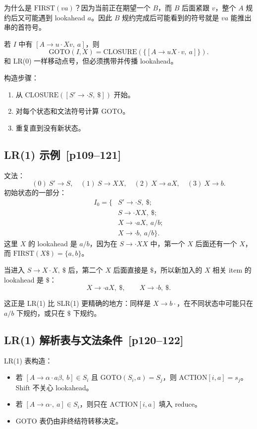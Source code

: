 \documentclass[UTF8,fontset=none,11pt]{ctexart}
\newenvironment{defbox}[1][]{%
  \par\medskip\noindent{\color{defrule}\rule{\linewidth}{1.1pt}}\par\nopagebreak
  \noindent{\bfseries\color{defrule}#1}\par\nopagebreak\smallskip}%
  {\par\nopagebreak\smallskip\noindent{\color{defrule}\rule{\linewidth}{0.4pt}}\par\medskip}
\newcommand{\pg}[1]{\texorpdfstring{{\small\color{graytext}\,[p#1]}}{ [p#1]}}
\newcommand{\FIRST}{\ensuremath{\mathrm{FIRST}}}
\newcommand{\ACTION}{\ensuremath{\mathrm{ACTION}}}
\newcommand{\GOTO}{\ensuremath{\mathrm{GOTO}}}
\newcommand{\CLOSURE}{\ensuremath{\mathrm{CLOSURE}}}
\begin{document}
为什么是 \(\FIRST(va)\)？因为当前正在期望一个 \(B\)，而 \(B\) 后面紧跟 \(v\)，整个 \(A\) 规约后又可能遇到 lookahead \(a\)。因此 \(B\) 规约完成后可能看到的符号就是 \(va\) 能推出串的首符号。

\begin{defbox}[LR(1) GOTO]
若 \(I\) 中有 \([A\to u\cdot Xv,\ a]\)，则
\[
\GOTO(I,X)=\CLOSURE(\{[A\to uX\cdot v,\ a]\}).
\]
和 LR(0) 一样移动点号，但必须携带并传播 lookahead。
\end{defbox}

构造步骤：

\begin{enumerate}
  \item 从 \(\CLOSURE([S'\to\cdot S,\ \$])\) 开始。
  \item 对每个状态和文法符号计算 \(\GOTO\)。
  \item 重复直到没有新状态。
\end{enumerate}

\subsection{LR(1) 示例 \pg{109--121}}

文法：
\[
(0)\ S'\to S,\quad (1)\ S\to XX,\quad (2)\ X\to aX,\quad (3)\ X\to b.
\]
初始状态的一部分：
\[
\begin{aligned}
I_0=\{&S'\to\cdot S,\ \$;\\
&S\to\cdot XX,\ \$;\\
&X\to\cdot aX,\ a/b;\\
&X\to\cdot b,\ a/b\}.
\end{aligned}
\]
这里 \(X\) 的 lookahead 是 \(a/b\)，因为在 \(S\to\cdot XX\) 中，第一个 \(X\) 后面还有一个 \(X\)，而 \(\FIRST(X\$)=\{a,b\}\)。

当进入 \(S\to X\cdot X,\ \$\) 后，第二个 \(X\) 后面直接是 \(\$\)，所以新加入的 \(X\) 相关 item 的 lookahead 是 \(\$\)：
\[
X\to\cdot aX,\ \$,\qquad X\to\cdot b,\ \$.
\]

这正是 LR(1) 比 SLR(1) 更精确的地方：同样是 \(X\to b\cdot\)，在不同状态中可能只在 \(a/b\) 下规约，或只在 \(\$\) 下规约。

\subsection{LR(1) 解析表与文法条件 \pg{120--122}}

LR(1) 表构造：

\begin{itemize}
  \item 若 \([A\to\alpha\cdot a\beta,\ b]\in S_i\) 且 \(\GOTO(S_i,a)=S_j\)，则 \(\ACTION[i,a]=s_j\)。Shift 不关心 lookahead。
  \item 若 \([A\to\alpha\cdot,\ a]\in S_i\)，则只在 \(\ACTION[i,a]\) 填入 reduce。
  \item \(\GOTO\) 表仍由非终结符转移决定。
\end{itemize}
\end{document}
